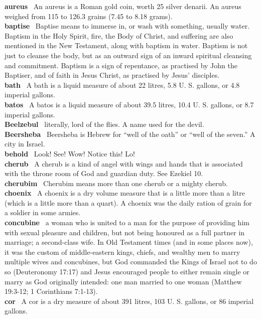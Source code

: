 \textbf{aureus}~ An aureus is a Roman gold coin, worth 25 silver
denarii. An aureus weighed from 115 to 126.3 grains (7.45 to 8.18
grams).\\
\textbf{baptise}~ Baptise means to immerse in, or wash with something,
usually water. Baptism in the Holy Spirit, fire, the Body of Christ, and
suffering are also mentioned in the New Testament, along with baptism in
water. Baptism is not just to cleanse the body, but as an outward sign
of an inward spiritual cleansing and commitment. Baptism is a sign of
repentance, as practised by John the Baptiser, and of faith in Jesus
Christ, as practised by Jesus' disciples.\\
\textbf{bath}~ A bath is a liquid measure of about 22 litres, 5.8 U. S.
gallons, or 4.8 imperial gallons.\\
\textbf{batos}~ A batos is a liquid measure of about 39.5 litres, 10.4
U. S. gallons, or 8.7 imperial gallons.\\
\textbf{Beelzebul}~ literally, lord of the flies. A name used for the
devil.\\
\textbf{Beersheba}~ Beersheba is Hebrew for ``well of the oath'' or
``well of the seven.'' A city in Israel.\\
\textbf{behold}~ Look! See! Wow! Notice this! Lo!\\
\textbf{cherub}~ A cherub is a kind of angel with wings and hands that
is associated with the throne room of God and guardian duty. See Ezekiel
10.\\
\textbf{cherubim}~ Cherubim means more than one cherub or a mighty
cherub.\\
\textbf{choenix}~ A choenix is a dry volume measure that is a little
more than a litre (which is a little more than a quart). A choenix was
the daily ration of grain for a soldier in some armies.\\
\textbf{concubine}~ a woman who is united to a man for the purpose of
providing him with sexual pleasure and children, but not being honoured
as a full partner in marriage; a second-class wife. In Old Testament
times (and in some places now), it was the custom of middle-eastern
kings, chiefs, and wealthy men to marry multiple wives and concubines,
but God commanded the Kings of Israel not to do so (Deuteronomy 17:17)
and Jesus encouraged people to either remain single or marry as God
originally intended: one man married to one woman (Matthew 19:3-12; 1
Corinthians 7:1-13).\\
\textbf{cor}~ A cor is a dry measure of about 391 litres, 103 U. S.
gallons, or 86 imperial gallons.\\
